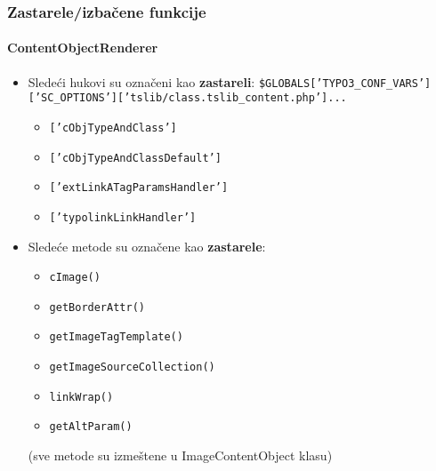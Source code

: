 \begin{frame}[fragile]
	\frametitle{Zastarele/izbačene funkcije}
	\framesubtitle{ContentObjectRenderer}

	\begin{itemize}
		\item Sledeći hukovi su označeni kao \textbf{zastareli}:\newline
			\tiny
				\texttt{\$GLOBALS['TYPO3\_CONF\_VARS']['SC\_OPTIONS']['tslib/class.tslib\_content.php']...}
			\normalsize

			\begin{itemize}\smaller
				\item \texttt{['cObjTypeAndClass']}
				\item \texttt{['cObjTypeAndClassDefault']}
				\item \texttt{['extLinkATagParamsHandler']}
				\item \texttt{['typolinkLinkHandler']}
			\end{itemize}

		\item Sledeće metode su označene kao \textbf{zastarele}:

			\begin{itemize}\smaller
				\item \texttt{cImage()}
				\item \texttt{getBorderAttr()}
				\item \texttt{getImageTagTemplate()}
				\item \texttt{getImageSourceCollection()}
				\item \texttt{linkWrap()}
				\item \texttt{getAltParam()}
			\end{itemize}

			\smaller
				(sve metode su izmeštene u ImageContentObject klasu)
			\normalsize

	\end{itemize}

\end{frame}


